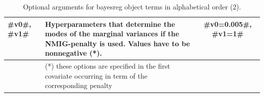 \begin{table}[ht]
\begin{tabular}{|l|p{0.6\linewidth}|c|}
#v0#, #v1#
& Hyperparameters that determine the modes of the marginal variances if the NMIG-penalty is used. Values
  have to be nonnegative (*).
& #v0=0.005#, #v1=1# \\
\hline




\hline
& (*) these options are specified in the first covariate occurring in term of
  the corresponding penalty
& \\
\hline




\end{tabular}
{\em\caption{\label{options2} Optional arguments for bayesreg
object terms in alphabetical order (2).}}
\end{table}


